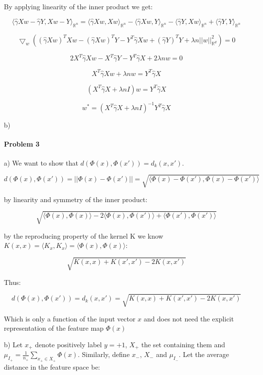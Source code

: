 \documentclass[12pt]{report}
\begin{document}
By applying linearity of the inner product we get:

$$\langle \hat{\gamma} Xw - \hat{\gamma} Y , Xw - Y \rangle_{\mathbb{R}^n}   = \langle \hat{\gamma} Xw, Xw \rangle_{\mathbb{R}^n} - \langle \hat{\gamma} Xw, Y \rangle_{\mathbb{R}^n}  -\langle  \hat{\gamma} Y, Xw \rangle_{\mathbb{R}^n} + \langle \hat{\gamma} Y, Y  \rangle_{\mathbb{R}^n} $$

$$  \bigtriangledown_w ( (\hat{\gamma} Xw)^T Xw -  (\hat{\gamma} Xw)^T Y  - Y^T  \hat{\gamma}  Xw + ( \hat{\gamma} Y)^T Y + \lambda n ||w||_{\mathbb{R}^d} ^2)  = 0$$

$$ 2 X^T \hat{\gamma} Xw -  X^T \hat{\gamma} Y  -Y^T  \hat{\gamma}  X  + 2 \lambda nw = 0 $$

$$ X^T \hat{\gamma} Xw + \lambda nw = Y^T  \hat{\gamma}  X $$

$$ (X^T \hat{\gamma} X + \lambda nI)w = Y^T  \hat{\gamma}  X $$

$$ w^* = (X^T \hat{\gamma} X + \lambda nI)^{-1}Y^T  \hat{\gamma}  X $$

b)


\paragraph{Problem 3}

a) We want to show that $d(\Phi(x), \Phi(x')) = d_{k}(x, x') $.

$$d(\Phi(x), \Phi(x')) = || \Phi(x) - \Phi(x')|| = \sqrt{ \langle \Phi(x) - \Phi(x'), \Phi(x) - \Phi(x') \rangle}$$

by linearity and symmetry of the inner product:

$$\sqrt{ \langle \Phi(x), \Phi(x) \rangle -  2\langle \Phi(x), \Phi(x') \rangle + \langle \Phi(x'), \Phi(x') \rangle}$$

by the reproducing property of the kernel K we know $K(x,x) = \langle K_x, K_x \rangle =\langle \Phi(x), \Phi(x) \rangle$:

$$\sqrt{ K(x,x) + K(x',x') - 2K(x,x')  }$$

Thus:

$$d(\Phi(x), \Phi(x')) =  d_{k}(x, x') = \sqrt{ K(x,x) + K(x',x') - 2K(x,x')  }$$

Which is only a function of the input vector $x$ and does not need the explicit representation of the feature map $\Phi(x)$

b) Let $x_+$ denote positively label $y = +1$, $X_+$ the set containing them and $ \mu_{I_+} =  \frac{1}{n_+}\sum_{x_+ \in X_+} \Phi(x) $. Similarly, define $x_-$, $X_-$ and $ \mu_{I_-}$. Let the average distance in the feature space be:
\end{document}
